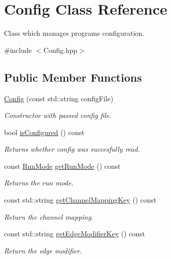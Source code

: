 \hypertarget{class_config}{}\section{Config Class Reference}
\label{class_config}


Class which manages programs configuration.  




{\ttfamily \#include $<$Config.\+hpp$>$}

\subsection*{Public Member Functions}
\begin{DoxyCompactItemize}
\item 
\hyperlink{class_config_af8b0e9dc72b16b73ebb32d177fb93e1b}{Config} (const std\+::string config\+File)
\begin{DoxyCompactList}\small\item\em Constructor with passed config file. \end{DoxyCompactList}\item 
bool \hyperlink{class_config_a47870f3f5bc52f5d0aa387c25e431055}{is\+Configured} () const
\begin{DoxyCompactList}\small\item\em Returns whether config was succesfully read. \end{DoxyCompactList}\item 
const \hyperlink{_modes_enum_8hpp_a3dfe11cf1a3a8121f6cd7fec4bf5947e}{Run\+Mode} \hyperlink{class_config_a1e69242b7f57068005d5ae195ca16530}{get\+Run\+Mode} () const
\begin{DoxyCompactList}\small\item\em Returns the run mode. \end{DoxyCompactList}\item 
const std\+::string \hyperlink{class_config_af674521a99614ecbd0cb8885b257663b}{get\+Channel\+Mapping\+Key} () const
\begin{DoxyCompactList}\small\item\em Return the channel mapping. \end{DoxyCompactList}\item 
const std\+::string \hyperlink{class_config_ae702b1e2139529bb2dc39905d7b35d12}{get\+Edge\+Modifier\+Key} () const
\begin{DoxyCompactList}\small\item\em Return the edge modifier. \end{DoxyCompactList}\item 

\end{DoxyCompactItemize}
